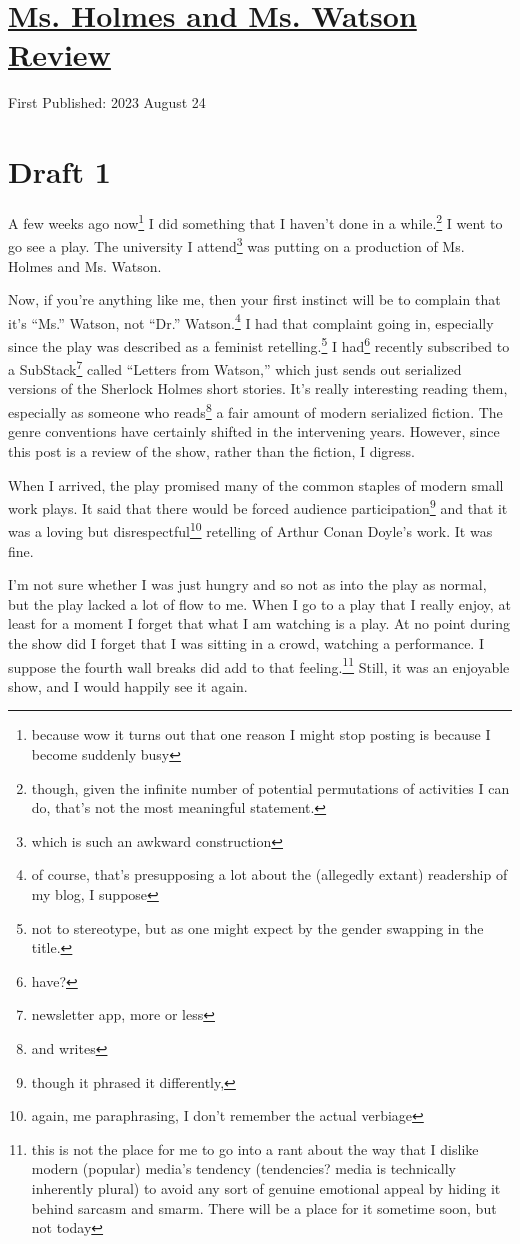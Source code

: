 \documentclass[12pt]{article}[titlepage]
\newcommand{\say}[1]{``#1''}
\newcommand{\1}{\={a}}
\newcommand{\2}{\={e}}
\newcommand{\3}{\={\i}}
\newcommand{\4}{\=o}
\newcommand{\5}{\=u}
\newcommand{\6}{\={A}}
\renewcommand{\,}{\textsuperscript{,}}
\begin{document}
\doublespacing
\section{\href{ms-holmes-ms-watson.html}{Ms. Holmes and Ms. Watson Review}}
First Published: 2023 August 24
\section{Draft 1}
A few weeks ago now\footnote{because wow it turns out that one reason I might stop posting is because I become suddenly busy} I did something that I haven't done in a while.\footnote{though, given the infinite number of potential permutations of activities I can do, that's not the most meaningful statement.}
I went to go see a play.
The university I attend\footnote{which is such an awkward construction} was putting on a production of Ms. Holmes and Ms. Watson.


Now, if you're anything like me, then your first instinct will be to complain that it's \say{Ms.} Watson, not \say{Dr.} Watson.\footnote{of course, that's presupposing a lot about the (allegedly extant) readership of my blog, I suppose}
I had that complaint going in, especially since the play was described as a feminist retelling.\footnote{not to stereotype, but as one might expect by the gender swapping in the title.}
I had\footnote{have?} recently subscribed to a SubStack\footnote{newsletter app, more or less} called \say{Letters from Watson,} which just sends out serialized versions of the Sherlock Holmes short stories.
It's really interesting reading them, especially as someone who reads\footnote{and writes} a fair amount of modern serialized fiction.
The genre conventions have certainly shifted in the intervening years.
However, since this post is a review of the show, rather than the fiction, I digress.


When I arrived, the play promised many of the common staples of modern small work plays.
It said that there would be forced audience participation\footnote{though it phrased it differently,} and that it was a loving but disrespectful\footnote{again, me paraphrasing, I don't remember the actual verbiage} retelling of Arthur Conan Doyle's work.
It was fine.


I'm not sure whether I was just hungry and so not as into the play as normal, but the play lacked a lot of flow to me.
When I go to a play that I really enjoy, at least for a moment I forget that what I am watching is a play.
At no point during the show did I forget that I was sitting in a crowd, watching a performance.
I suppose the fourth wall breaks did add to that feeling.\footnote{this is not the place for me to go into a rant about the way that I dislike modern (popular) media's tendency (tendencies? media is technically inherently plural) to avoid any sort of genuine emotional appeal by hiding it behind sarcasm and smarm.
There will be a place for it sometime soon, but not today}
Still, it was an enjoyable show, and I would happily see it again.
\end{document}
